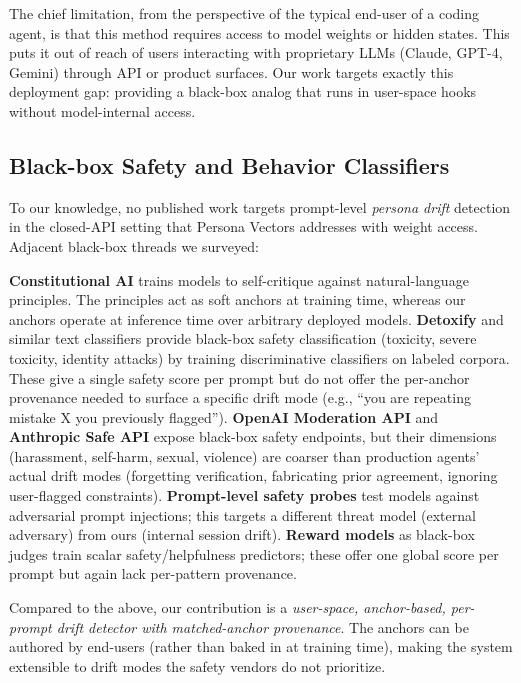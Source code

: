 The chief limitation, from the perspective of the typical
end-user of a coding agent, is that this method requires access
to model weights or hidden states. This puts it out of reach of
users interacting with proprietary LLMs (Claude, GPT-4, Gemini)
through API or product surfaces. Our work targets exactly this
deployment gap: providing a black-box analog that runs in
user-space hooks without model-internal access.

\subsection{Black-box Safety and Behavior Classifiers}
\label{sec:related-blackbox}

To our knowledge, no published work targets prompt-level
\emph{persona drift} detection in the closed-API setting that
Persona Vectors addresses with weight access. Adjacent black-box
threads we surveyed:

\textbf{Constitutional AI} \citep{constitutional2022} trains models
to self-critique against natural-language principles. The
principles act as soft anchors at training time, whereas our
anchors operate at inference time over arbitrary deployed models.
\textbf{Detoxify} and similar text classifiers \citep{detoxify}
provide black-box safety classification (toxicity, severe
toxicity, identity attacks) by training discriminative classifiers
on labeled corpora. These give a single safety score per prompt
but do not offer the per-anchor provenance needed to surface a
specific drift mode (e.g., ``you are repeating mistake X you
previously flagged'').
\textbf{OpenAI Moderation API} \citep{openai-mod} and
\textbf{Anthropic Safe API} \citep{anthropic-safe} expose
black-box safety endpoints, but their dimensions
(harassment, self-harm, sexual, violence) are coarser than
production agents' actual drift modes (forgetting verification,
fabricating prior agreement, ignoring user-flagged constraints).
\textbf{Prompt-level safety probes} \citep{promptinject2023,
textdefendr2024} test models against adversarial prompt
injections; this targets a different threat model (external
adversary) from ours (internal session drift).
\textbf{Reward models} as black-box judges
\citep{skywork2024,helpsteer2024} train scalar safety/helpfulness
predictors; these offer one global score per prompt but again
lack per-pattern provenance.

Compared to the above, our contribution is a
\emph{user-space, anchor-based, per-prompt drift detector with
matched-anchor provenance}. The anchors can be authored by
end-users (rather than baked in at training time), making the
system extensible to drift modes the safety vendors do not
prioritize.

